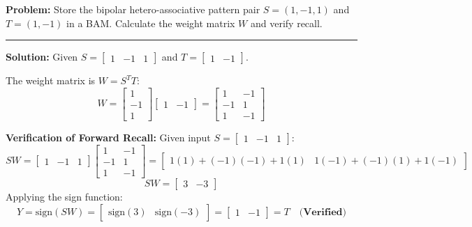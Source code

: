 \documentclass[12pt,a4paper]{article}
\begin{document}
\begin{tcolorbox}[examplebox, title={BAM Correlation Matrix Computation}]
\textbf{Problem:} Store the bipolar hetero-associative pattern pair $S = (1, -1, 1)$ and $T = (1, -1)$ in a BAM. Calculate the weight matrix $W$ and verify recall.
\par\vspace{4pt}\noindent\rule{\linewidth}{0.5pt}\par
\textbf{Solution:}
Given $S = \begin{bmatrix} 1 & -1 & 1 \end{bmatrix}$ and $T = \begin{bmatrix} 1 & -1 \end{bmatrix}$.
\par\noindent
The weight matrix is $W = S^T T$:
\begin{equation*}
  W = \begin{bmatrix} 1 \\ -1 \\ 1 \end{bmatrix} \begin{bmatrix} 1 & -1 \end{bmatrix} = \begin{bmatrix} 1 & -1 \\ -1 & 1 \\ 1 & -1 \end{bmatrix}
\end{equation*}
\par\noindent
\textbf{Verification of Forward Recall:}
Given input $S = \begin{bmatrix} 1 & -1 & 1 \end{bmatrix}$:
\begin{equation*}
  S W = \begin{bmatrix} 1 & -1 & 1 \end{bmatrix} \begin{bmatrix} 1 & -1 \\ -1 & 1 \\ 1 & -1 \end{bmatrix} = \begin{bmatrix} 1(1) + (-1)(-1) + 1(1) & 1(-1) + (-1)(1) + 1(-1) \end{bmatrix}
\end{equation*}
\begin{equation*}
  S W = \begin{bmatrix} 3 & -3 \end{bmatrix}
\end{equation*}
Applying the sign function:
\begin{equation*}
  Y = \text{sign}(S W) = \begin{bmatrix} \text{sign}(3) & \text{sign}(-3) \end{bmatrix} = \begin{bmatrix} 1 & -1 \end{bmatrix} = T \quad \textbf{(Verified)}
\end{equation*}
\end{tcolorbox}
\end{document}
